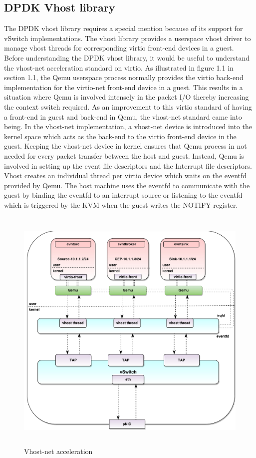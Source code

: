 \subsection{DPDK Vhost library}
The DPDK vhost library requires a special mention because of its support for vSwitch implementations. The vhost library provides a userspace vhost driver to manage vhost threads for corresponding virtio front-end devices in a guest. Before understanding the DPDK vhost library, it would be useful to understand the vhost-net acceleration standard on virtio. As illustrated in figure 1.1 in section 1.1, the Qemu userspace process normally provides the virtio back-end implementation for the virtio-net front-end device in a guest. This results in a situation where Qemu is involved intensely in the packet I/O thereby increasing the context switch required. As an improvement to this virtio standard of having a front-end in guest and back-end in Qemu, the vhost-net standard came into being. In the vhost-net implementation, a vhost-net device is introduced into the kernel space which acts as the back-end to the virtio front-end device in the guest. Keeping the vhost-net device in kernel ensures that Qemu process in not needed for every packet transfer between the host and guest. Instead, Qemu is involved in setting up the event file descriptors and the Interrupt file descriptors. Vhost creates an individual thread per virtio device which waits on the eventfd provided by Qemu. The host machine uses the eventfd to communicate with the guest by binding the eventfd to an interrupt source or listening to the eventfd which is triggered by the KVM when the guest writes the NOTIFY register. 

 \begin{figure}[H]
 \centering
 \caption{Vhost-net acceleration}
 \includegraphics[height=12cm]{vhostnet.pdf}
\end{figure}

